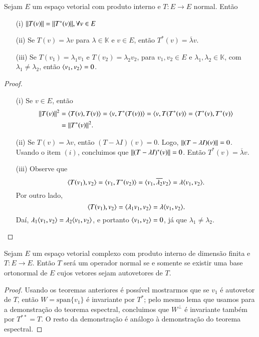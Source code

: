 \begin{teo}
	Sejam $E$ um espaço vetorial com produto interno e $T:E\to E$ normal. Então
    \begin{itemize}
    \item[(i)] $\| T(v) \|=\| T^*(v) \|, \forall v\in E$
    \item[(ii)] Se $T(v)=\lambda v$ para $\lambda \in {\mathbb{K}}$ e $v\in E$, então $T^*(v)=\overline{\lambda} v$.
    \item[(iii)] Se $T(v_1)=\lambda_1 v_1$ e $T(v_2)=\lambda_2 v_2$, para $v_1,v_2 \in E$ e $\lambda_1,\lambda_2 \in {\mathbb{K}}$, com $\lambda_1 \ne \lambda_2$, então $\langle v_1, v_2 \rangle=0$.
    \end{itemize}
\end{teo}
\begin{proof}
	\begin{itemize}
    	\item[(i)] Se $v\in E$, então
        \begin{align*}
        	\| T(v) \|^2 &= \langle T(v), T(v) \rangle = \langle v, T^*(T(v)) \rangle = \langle v, T(T^*(v) \rangle = \langle T^*(v), T^*(v) \rangle\\
            &=\| T^*(v) \|^2.
        \end{align*}
        
        \item[(ii)] Se $T(v)=\lambda v$, então $(T-\lambda I)(v)=0$. Logo, $\| (T-\lambda I)(v) \|=0$. Usando o item $(i)$, concluimos que $\| (T-\lambda I)^*(v) \|=0$. Então $T^*(v)=\overline{\lambda} v$.
        
        \item[(iii)] Observe que
        \begin{equation*}
        	\langle T(v_1), v_2 \rangle = \langle v_1, T^*(v_2) \rangle = \langle v_1, \overline{\lambda_2}v_2 \rangle = \lambda \langle v_1, v_2 \rangle.
        \end{equation*}
        Por outro lado,
        \begin{equation*}
        	\langle T(v_1), v_2 \rangle = \langle \lambda_1 v_1, v_2 \rangle = \lambda\langle v_1, v_2 \rangle.
        \end{equation*}
        Daí, $\lambda_1\langle v_1, v_2 \rangle = \lambda_2\langle v_1, v_2 \rangle$, e portanto $\langle v_1, v_2 \rangle=0$, já que $\lambda_1\ne \lambda_2$.
    \end{itemize}
\end{proof}

\begin{teo}
	Sejam $E$ um espaço vetorial complexo com produto interno de dimensão finita e $T:E\to E$. Então $T$ será um operador normal se e somente se existir uma base ortonormal de $E$ cujos vetores sejam autovetores de $T$.
\end{teo}

\begin{proof}
Usando os teoremas anteriores é possível mostrarmos que se $v_1$ é autovetor de $T$, então $W=\text{span}\{v_1\}$ é invariante por $T^*$; pelo mesmo lema que usamos para a demonstração do teorema espectral, concluimos que $W^{\perp}$ é invariante também por $T^{**}=T$. O resto da demonstração é análogo à demonstração do teorema espectral.
\end{proof}
